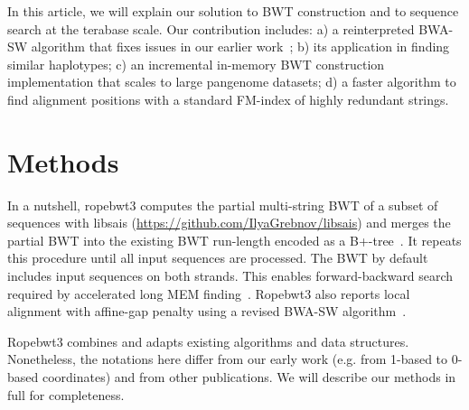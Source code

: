 \documentclass[webpdf,contemporary,large,namedate]{oup-authoring-template}%
\begin{document}
In this article, we will explain our solution to BWT construction
and to sequence search at the terabase scale.
Our contribution includes:
a) a reinterpreted BWA-SW algorithm that fixes issues in our earlier work~\citep{Li:2010fk};
b) its application in finding similar haplotypes;
c) an incremental in-memory BWT construction implementation that scales to large pangenome datasets;
d) a faster algorithm to find alignment positions with a standard FM-index of highly redundant strings.

\section{Methods}

In a nutshell, ropebwt3 computes the partial multi-string BWT of a subset of sequences with libsais (\url{https://github.com/IlyaGrebnov/libsais})
and merges the partial BWT into the existing BWT run-length encoded as a B+-tree~\citep{Li:2014ab}.
It repeats this procedure until all input sequences are processed.
The BWT by default includes input sequences on both strands.
This enables forward-backward search~\citep{Li:2012fk} required by accelerated long MEM finding~\citep{DBLP:conf/dlt/Gagie24}.
Ropebwt3 also reports local alignment with affine-gap penalty using a revised BWA-SW algorithm~\citep{Li:2010fk}.

Ropebwt3 combines and adapts existing algorithms and data structures.
Nonetheless, the notations here differ from our early work (e.g. from 1-based to 0-based coordinates) and from other publications.
We will describe our methods in full for completeness.
\end{document}
